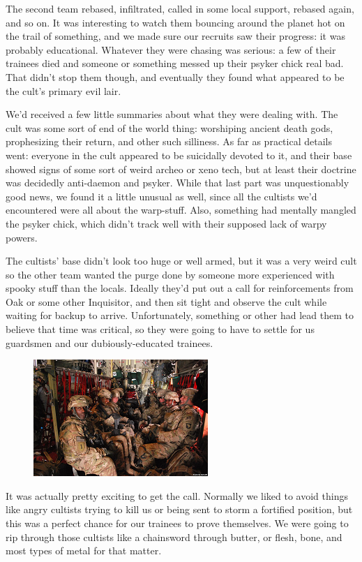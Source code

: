 The second team rebased, infiltrated, called in some local support, rebased again, and so on. 
It was interesting to watch them bouncing around the planet hot on the trail of something, and we made sure our recruits saw their progress: 
it was probably educational. 
Whatever they were chasing was serious: 
a few of their trainees died and someone or something messed up their psyker chick real bad. 
That didn’t stop them though, and eventually they found what appeared to be the cult’s primary evil lair.

We’d received a few little summaries about what they were dealing with. 
The cult was some sort of end of the world thing: 
worshiping ancient death gods, prophesizing their return, and other such silliness. 
As far as practical details went: 
everyone in the cult appeared to be suicidally devoted to it, and their base showed signs of some sort of weird archeo or xeno tech, but at least their doctrine was decidedly anti-daemon and psyker. 
While that last part was unquestionably good news, we found it a little unusual as well, since all the cultists we’d encountered were all about the warp-stuff. 
Also, something had mentally mangled the psyker chick, which didn’t track well with their supposed lack of warpy powers.

The cultists’ base didn’t look too huge or well armed, but it was a very weird cult so the other team wanted the purge done by someone more experienced with spooky stuff than the locals. 
Ideally they’d put out a call for reinforcements from Oak or some other Inquisitor, and then sit tight and observe the cult while waiting for backup to arrive. 
Unfortunately, something or other had lead them to believe that time was critical, so they were going to have to settle for us guardsmen and our dubiously-educated trainees.

\begin{figure}
	\begin{center}
		\includegraphics[width=\figwidth]{pics/8/36.png}
	\end{center}
\end{figure}
It was actually pretty exciting to get the call. 
Normally we liked to avoid things like angry cultists trying to kill us or being sent to storm a fortified position, but this was a perfect chance for our trainees to prove themselves. 
We were going to rip through those cultists like a chainsword through butter, or flesh, bone, and most types of metal for that matter.

